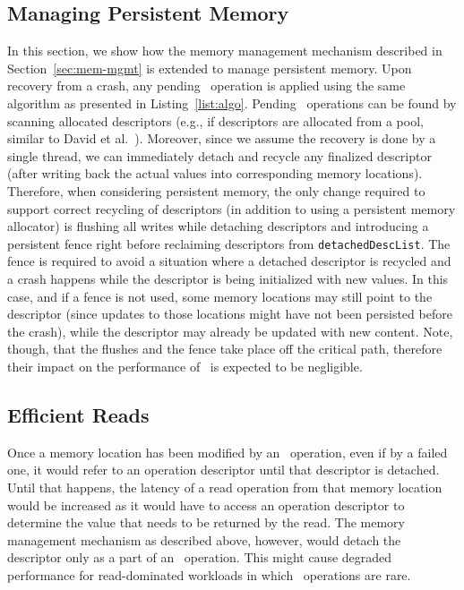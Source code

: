 \subsection{Managing Persistent Memory}
\label{sec:persistent-memory}
In this section, we show how the memory management mechanism described in Section~\ref{sec:mem-mgmt} is extended to manage persistent memory.
Upon recovery from a crash, any pending \pmcas\ operation is applied using the same algorithm as presented in Listing~\ref{list:algo}.
Pending \pmcas\ operations can be found by scanning allocated descriptors (e.g., if descriptors are allocated from a pool, similar to David et al.~\cite{david18}).
Moreover, since we assume the recovery is done by a single thread, we can immediately 
detach and recycle any finalized descriptor (after writing back the actual values into corresponding memory locations).
Therefore, when considering persistent memory, 
the only change required to support correct recycling of descriptors (in addition to using a persistent memory allocator) is
flushing all writes while detaching descriptors and introducing a persistent fence 
right before reclaiming descriptors from \texttt{detachedDescList}.
The fence is required to avoid a situation where a detached descriptor is recycled and a crash happens while 
the descriptor is being initialized with new values.
In this case, and if a fence is not used, 
some memory locations may still point to the descriptor (since updates to those locations might have not been persisted before the crash), 
while the descriptor may already be updated with new content.
Note, though, that the flushes and the fence take place off the critical path, 
therefore their impact on the performance of \pmcas\ is expected to be negligible.


\subsection{Efficient Reads}
\label{sec:reads}
Once a memory location has been modified by an \mcas\ operation, even if by a failed one, it would
refer to an operation descriptor until that descriptor is detached.
Until that happens, the latency of a read operation from that memory location would be increased as it would have to access  
an operation descriptor to determine the value that needs to be returned by the read.
The memory management mechanism as described above, however, would detach the descriptor only
as a part of an \mcas\ operation.
This might cause degraded performance for read-dominated workloads in which \mcas\ operations are rare.

